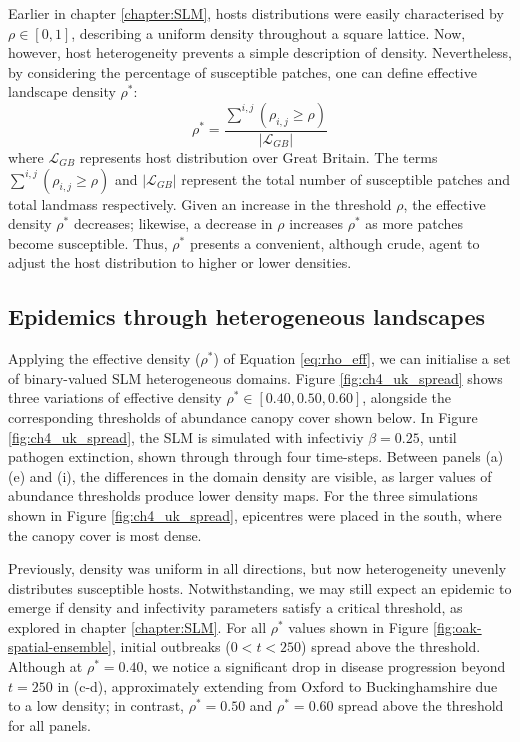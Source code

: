 Earlier in chapter \ref{chapter:SLM}, hosts distributions were easily characterised by $\rho \in [0, 1]$, 
describing a uniform density throughout a square lattice.
Now, however, host heterogeneity prevents a simple description of density.
Nevertheless, by considering the percentage of susceptible patches,
one can define effective landscape density $\rho^*$:
\begin{equation}
    \label{eq:rho_eff}
  \rho^{*} = \frac{\sum^{i, j} ( \rho_{i,j} \geq \rho )}{|\mathcal{L}_{GB}|}
\end{equation}
where $\mathcal{L}_{GB}$ represents host distribution over Great Britain. 
The terms $\sum^{i, j} (\rho_{i,j} \geq \rho)$ and $|\mathcal{L}_{GB}|$ represent 
the total number of susceptible patches and total landmass respectively. 
Given an increase in the threshold $\rho$, the effective density $\rho^*$ decreases; 
likewise, a decrease in $\rho$ increases $\rho^*$ as more patches become susceptible. 
Thus, $\rho^{*}$ presents a convenient, although crude, agent
to adjust the host distribution to higher or lower densities.

\subsection{Epidemics through heterogeneous landscapes}

Applying the effective density ($\rho^{*}$) of Equation \ref{eq:rho_eff},
we can initialise a set of binary-valued SLM heterogeneous domains. 
Figure \ref{fig:ch4_uk_spread} shows three variations of effective density
$\rho^{*} \in [0.40, 0.50, 0.60]$, alongside the corresponding thresholds of
abundance canopy cover shown below. In Figure \ref{fig:ch4_uk_spread}, the SLM
is simulated with infectiviy $\beta=0.25$, until pathogen extinction, 
shown through through four time-steps. Between panels (a) (e) and (i), 
the differences in the domain density are visible,
as larger values of abundance thresholds produce lower density maps.
For the three simulations shown in Figure \ref{fig:ch4_uk_spread}, 
epicentres were placed in the south, where the canopy cover is most dense. 

Previously, density was uniform in all directions, 
but now heterogeneity unevenly distributes susceptible hosts. 
Notwithstanding, we may still expect an epidemic to emerge if density 
and infectivity parameters satisfy a critical threshold, as explored in chapter \ref{chapter:SLM}.
For all $\rho^*$ values shown in Figure \ref{fig:oak-spatial-ensemble}, 
initial outbreaks ($0<t<250$) spread above the threshold.
Although at $\rho^*=0.40$, we notice a significant drop in disease progression 
beyond $t=250$ in (c-d), approximately extending from Oxford to Buckinghamshire due to a low density;
in contrast, $\rho^*=0.50$ and $\rho^*=0.60$ spread above the threshold for all panels.

